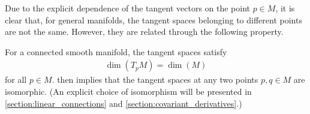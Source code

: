     Due to the explicit dependence of the tangent vectors on the point $p\in M$, it is clear that, for general manifolds, the tangent spaces belonging to different points are not the same. However, they are related through the following property.
    \begin{property}
        For a connected smooth manifold, the tangent spaces satisfy
        \begin{gather}
            \dim(T_pM)=\dim(M)
        \end{gather}
        for all $p\in M$.  then implies that the tangent spaces at any two points $p,q\in M$ are isomorphic. (An explicit choice of isomorphism will be presented in \cref{section:linear_connections} and \cref{section:covariant_derivatives}.)
    \end{property}

